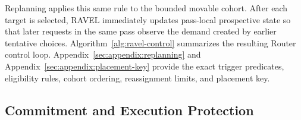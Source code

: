 \documentclass[letterpaper,twocolumn,10pt]{article}
\begin{document}
Replanning applies this same rule to the bounded movable cohort.
After each target is selected, RAVEL immediately updates pass-local
prospective state so that later requests in the same pass observe the demand
created by earlier tentative choices.
Algorithm~\ref{alg:ravel-control} summarizes the resulting Router control loop.
Appendix~\ref{sec:appendix:replanning} and
Appendix~\ref{sec:appendix:placement-key} provide the exact trigger predicates,
eligibility rules, cohort ordering, reassignment limits, and placement key.


\begin{algorithm}[t]
\caption{\textsc{RAVEL} Router Control Loop}
\label{alg:ravel-control}
\small


\BlankLine


\BlankLine

\end{algorithm}


\subsection{Commitment and Execution Protection}
\label{sec:design:commitment}
\end{document}
